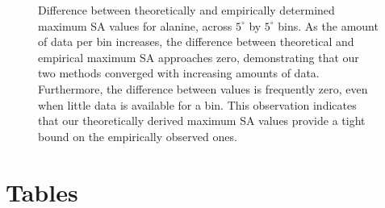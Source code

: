 \documentclass[11pt]{article}
\begin{document}
\begin{figure}[H]
\caption{\label{fig:EvC} Difference between theoretically and empirically determined maximum SA values for alanine, across $5^\circ$ by $5^\circ$ bins. As the amount of data per bin increases, the difference between theoretical and empirical maximum SA approaches zero, demonstrating that our two methods converged with increasing amounts of data. Furthermore, the difference between values is frequently zero, even when little data is available for a bin. This observation indicates that our theoretically derived maximum SA values provide a tight bound on the empirically observed ones.}
\end{figure}

\cleardoublepage

\section*{Tables}
\end{document}
